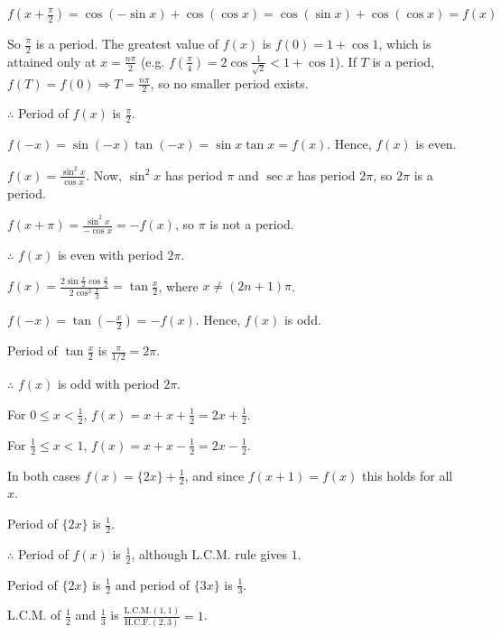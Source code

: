 \item $f\left(x + \frac{\pi}{2}\right) = \cos(-\sin x) + \cos(\cos x) = \cos(\sin x) + \cos(\cos x) =
  f(x)$

  So $\frac{\pi}{2}$ is a period. The greatest value of $f(x)$ is $f(0) = 1 + \cos1$, which is
  attained only at $x = \frac{n\pi}{2}$ (e.g. $f\left(\frac{\pi}{4}\right) = 2\cos\frac{1}{\sqrt{2}} <
  1 + \cos1$). If $T$ is a period, $f(T) = f(0) \Rightarrow T = \frac{n\pi}{2}$, so no smaller period
  exists.

  $\therefore$ Period of $f(x)$ is $\frac{\pi}{2}$.

\item $f(-x) = \sin(-x)\tan(-x) = \sin x\tan x = f(x)$. Hence, $f(x)$ is even.

  $f(x) = \frac{\sin^2x}{\cos x}$. Now, $\sin^2x$ has period $\pi$ and $\sec x$ has period $2\pi$,
  so $2\pi$ is a period.

  $f(x + \pi) = \frac{\sin^2x}{-\cos x} = -f(x)$, so $\pi$ is not a period.

  $\therefore$ $f(x)$ is even with period $2\pi$.

\item $f(x) = \frac{2\sin\frac{x}{2}\cos\frac{x}{2}}{2\cos^2\frac{x}{2}} = \tan\frac{x}{2}$, where
  $x\neq(2n + 1)\pi$.

  $f(-x) = \tan\left(-\frac{x}{2}\right) = -f(x)$. Hence, $f(x)$ is odd.

  Period of $\tan\frac{x}{2}$ is $\frac{\pi}{1/2} = 2\pi$.

  $\therefore$ $f(x)$ is odd with period $2\pi$.

\item For $0\leq x < \frac{1}{2}$, $f(x) = x + x + \frac{1}{2} = 2x + \frac{1}{2}$.

  For $\frac{1}{2}\leq x < 1$, $f(x) = x + x - \frac{1}{2} = 2x - \frac{1}{2}$.

  In both cases $f(x) = \{2x\} + \frac{1}{2}$, and since $f(x + 1) = f(x)$ this holds for all $x$.

  Period of $\{2x\}$ is $\frac{1}{2}$.

  $\therefore$ Period of $f(x)$ is $\frac{1}{2}$, although L.C.M. rule gives $1$.

\item Period of $\{2x\}$ is $\frac{1}{2}$ and period of $\{3x\}$ is $\frac{1}{3}$.

  L.C.M. of $\frac{1}{2}$ and $\frac{1}{3}$ is $\frac{\mathrm{L.C.M.(1, 1)}}{\mathrm{H.C.F.(2, 3)}} =
  1$.

